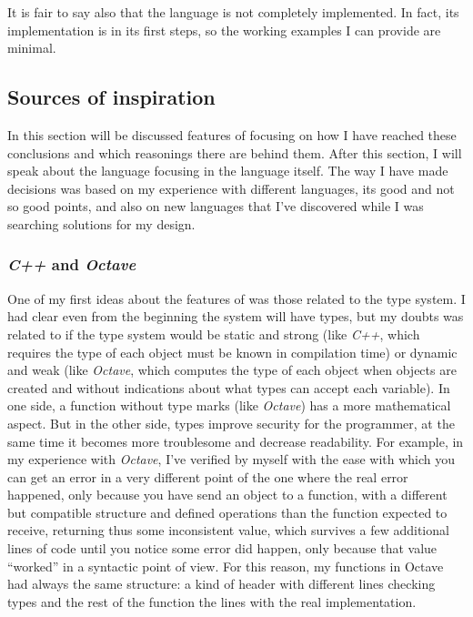 \documentclass{article}
\begin{document}
It is fair to say also that the language is not completely implemented. In fact,
its implementation is in its first steps, so the working examples I can provide
are minimal.


\subsection{Sources of inspiration}
In this section will be discussed features of \faupp focusing on how I have
reached these conclusions and which reasonings there are behind them. After this
section, I will speak about the language focusing in the language itself. The
way I have made decisions was based on my experience with different languages,
its good and not so good points, and also on new languages that I've discovered
while I was searching solutions for my design.

\subsubsection{\textit{C++} and \textit{Octave}}
One of my first ideas about the features of \faupp was those related to the type
system. I had clear even from the beginning the system will have types, but my
doubts was related to if the type system would be static and strong (like
\textit{C++}, which requires the type of each object must be known in
compilation time) or dynamic and weak (like \textit{Octave}, which computes the
type of each object when objects are created and without indications about what
types can accept each variable). In one side, a function without type marks
(like \textit{Octave}) has a more mathematical aspect. But in the other side,
types improve security for the programmer, at the same time it becomes more
troublesome and decrease readability. For example, in my experience with
\textit{Octave}, I've verified by myself with the ease with which you can get an
error in a very different point of the one where the real error happened, only
because you have send an object to a function, with a different but compatible
structure and defined operations than the function expected to receive,
returning thus some inconsistent value, which survives a few additional lines of
code until you notice some error did happen, only because that value ``worked''
in a syntactic point of view. For this reason, my functions in Octave had always
the same structure: a kind of header with different lines checking types and the
rest of the function the lines with the real implementation.
\end{document}

